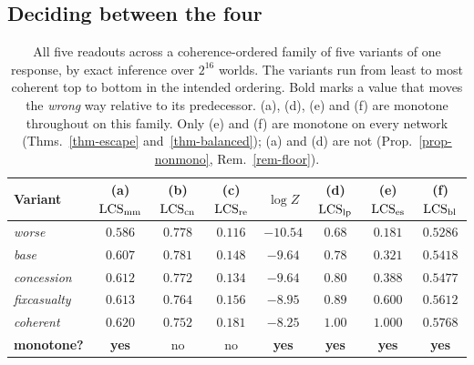 \subsection{Deciding between the four}
\label{sec-selection}

\begin{table}[t]
\centering\small
\caption{All five readouts across a coherence-ordered family of five variants of one response, by
  exact inference over $2^{16}$ worlds. The variants run from least to most coherent top to bottom in
  the intended ordering. Bold marks a value that moves the \emph{wrong} way relative to its
  predecessor. (a), (d), (e) and (f) are monotone throughout on this family. Only (e) and (f) are
  monotone on every network (Thms.~\ref{thm-escape} and~\ref{thm-balanced}); (a) and (d) are not
  (Prop.~\ref{prop-nonmono}, Rem.~\ref{rem-floor}).}
\label{tab:allcands}
\setlength{\tabcolsep}{4pt}
\begin{tabular}{@{}lccccccc@{}}
\toprule
Variant & (a) $\mathrm{LCS}_{\mathrm{mm}}$ & (b) $\mathrm{LCS}_{\mathrm{cn}}$ & (c) $\mathrm{LCS}_{\mathrm{re}}$ & $\log Z$ & (d) $\mathrm{LCS}_{\mathrm{lp}}$
  & (e) $\mathrm{LCS}_{\mathrm{es}}$ & (f) $\mathrm{LCS}_{\mathrm{bl}}$ \\
\midrule
\emph{worse}       & $0.586$ & $\mathbf{0.778}$ & $0.116$ & $-10.54$ & $0.68$ & $0.181$ & $0.5286$ \\
\emph{base}        & $0.607$ & $0.781$          & $0.148$ & $-9.64$  & $0.78$ & $0.321$ & $0.5418$ \\
\emph{concession}  & $0.612$ & $\mathbf{0.772}$ & $\mathbf{0.134}$ & $-9.64$ & $0.80$ & $0.388$ & $0.5477$ \\
\emph{fixcasualty} & $0.613$ & $\mathbf{0.764}$ & $0.156$ & $-8.95$  & $0.89$ & $0.600$ & $0.5612$ \\
\emph{coherent}    & $0.620$ & $\mathbf{0.752}$ & $0.181$ & $-8.25$  & $1.00$ & $1.000$ & $0.5768$ \\
\midrule
\textbf{monotone?} & \textbf{yes} & no & no & \textbf{yes} & \textbf{yes} & \textbf{yes} & \textbf{yes} \\
\bottomrule
\end{tabular}
\end{table}

